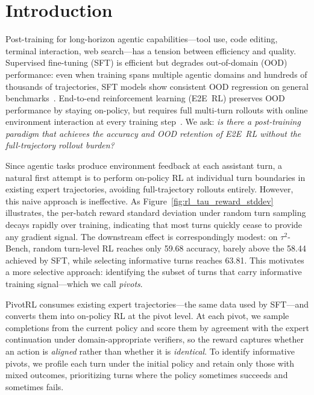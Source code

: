 \section{Introduction}

Post-training for long-horizon agentic capabilities---tool use, code editing, terminal interaction, web search---has a tension between efficiency and quality.
Supervised fine-tuning (SFT) is efficient but degrades out-of-domain (OOD) performance: even when training spans multiple agentic domains and hundreds of thousands of trajectories, SFT models show consistent OOD regression on general benchmarks~\citep{shenfeld2025rlsrazoronlinereinforcement, chen2025retainingdoingroleonpolicy, chu2025sftmemorizesrlgeneralizes}.
End-to-end reinforcement learning (E2E~RL) preserves OOD performance by staying on-policy, but requires full multi-turn rollouts with online environment interaction at every training step~\citep{shenfeld2025rlsrazoronlinereinforcement, chen2025retainingdoingroleonpolicy, chu2025sftmemorizesrlgeneralizes}.
We ask: \emph{is there a post-training paradigm that achieves the accuracy and OOD retention of E2E~RL without the full-trajectory rollout burden?}

Since agentic tasks produce environment feedback at each assistant turn, a natural first attempt is to perform on-policy RL at individual turn boundaries in existing expert trajectories, avoiding full-trajectory rollouts entirely.
However, this naive approach is ineffective.
As Figure~\ref{fig:rl_tau_reward_stddev} illustrates, the per-batch reward standard deviation under random turn sampling decays rapidly over training, indicating that most turns quickly cease to provide any gradient signal.
The downstream effect is correspondingly modest: on $\tau^2$-Bench, random turn-level RL reaches only 59.68 accuracy, barely above the 58.44 achieved by SFT, while selecting informative turns reaches 63.81.
This motivates a more selective approach: identifying the subset of turns that carry informative training signal---which we call \emph{pivots}.

PivotRL consumes existing expert trajectories---the same data used by SFT---and converts them into on-policy RL at the pivot level.
At each pivot, we sample completions from the current policy and score them by agreement with the expert continuation under domain-appropriate verifiers, so the reward captures whether an action is \emph{aligned} rather than whether it is \emph{identical}.
To identify informative pivots, we profile each turn under the initial policy and retain only those with mixed outcomes, prioritizing turns where the policy sometimes succeeds and sometimes fails.

